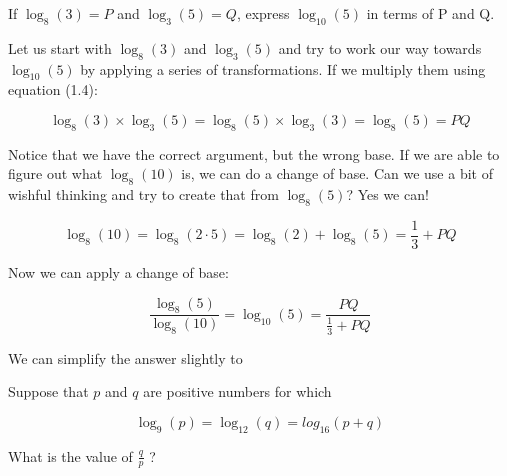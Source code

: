\begin{question}

If $\log_8(3) = P$ and $\log_3(5) = Q$, express $\log_{10}(5)$ in terms of P and Q.

\end{question}

\begin{solution}

Let us start with $\log_8(3)$ and $\log_3(5)$ and try to work our way towards $\log_{10}(5)$ by applying a series of transformations. If we multiply them using equation (1.4):

$$
   \log_8(3) \times \log_3(5) = \log_8(5) \times \log_3(3) = \log_8(5) = PQ
$$

Notice that we have the correct argument, but the wrong base. If we are able to figure out what $\log_8(10)$ is, we can do a change of base. Can we use a bit of wishful thinking and try to create that from $\log_8(5)$? Yes we can!

$$
   \log_8(10) = \log_8(2 \cdot 5) = \log_8(2) + \log_8(5) = \frac{1}{3} + PQ
$$

Now we can apply a change of base:

$$
   \frac{\log_8(5)}{\log_8(10)} = \log_{10}(5) = \frac{PQ}{\frac{1}{3}+PQ}
$$

We can simplify the answer slightly to 

\end{solution}

\begin{question}

Suppose that $p$ and $q$ are positive numbers for which

$$
   \log_9(p) = \log_{12}(q) = log_{16}(p+q)
$$

What is the value of $\frac{q}{p}$ ?
\end{question}

